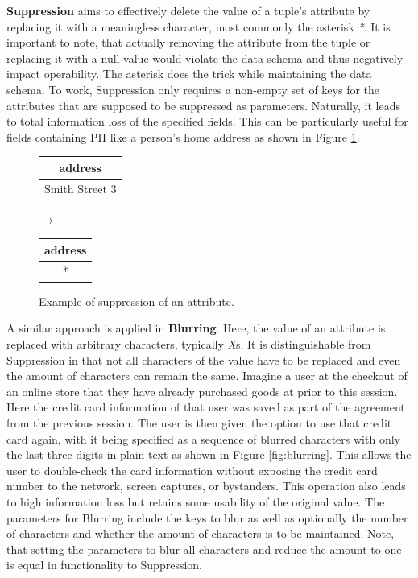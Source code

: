 \textbf{Suppression} aims to effectively delete the value of a tuple's attribute by replacing it with a meaningless character, most commonly the asterisk \textit{*}. It is important to note, that actually removing the attribute from the tuple or replacing it with a null value would violate the data schema and thus negatively impact operability. The asterisk does the trick while maintaining the data schema. To work, Suppression only requires a non-empty set of keys for the attributes that are supposed to be suppressed as parameters. Naturally, it leads to total information loss of the specified fields. This can be particularly useful for fields containing \ac{PII} like a person's home address as shown in Figure \ref{fig:suppression}. 

\bigskip

\begin{figure}[ht]
    \begin{center}
    \footnotesize{
        \renewcommand{\arraystretch}{1.5}
        \begin{tabular}{|c|}
            \hline
            address \\
            \hline
            Smith Street 3 \\
            \hline
            \end{tabular}
            \quad $\longrightarrow$ \quad
            \begin{tabular}{|c|}
            \hline
            address \\
            \hline
            * \\
            \hline
        \end{tabular}
    }
    \end{center}
    \caption{Example of suppression of an attribute.\label{fig:suppression}}
\end{figure}

A similar approach is applied in \textbf{Blurring}. Here, the value of an attribute is replaced with arbitrary characters, typically \textit{X}s. It is distinguishable from Suppression in that not all characters of the value have to be replaced and even the amount of characters can remain the same. Imagine a user at the checkout of an online store that they have already purchased goods at prior to this session. Here the credit card information of that user was saved as part of the agreement from the previous session. The user is then given the option to use that credit card again, with it being specified as a sequence of blurred characters with only the last three digits in plain text as shown in Figure \ref{fig:blurring}. This allows the user to double-check the card information without exposing the credit card number to the network, screen captures, or bystanders. This operation also leads to high information loss but retains some usability of the original value. The parameters for Blurring include the keys to blur as well as optionally the number of characters and whether the amount of characters is to be maintained. Note, that setting the parameters to blur all characters and reduce the amount to one is equal in functionality to Suppression. 

